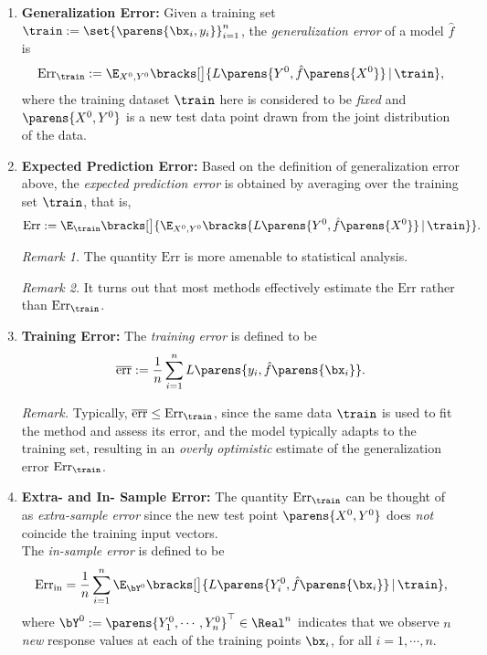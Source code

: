 \documentclass[12pt]{article}
\begin{document}
\begin{enumerate}[label=\textbf{\arabic*.}]
	
	\item \textbf{Generalization Error:} Given a training set $ \train := \set{ \parens{\bx_i, y_i}}_{i=1}^n$, the \emph{generalization error} of a model $\hat{f}$ is 
	\begin{align}
		\mathrm{Err}_{\train} := \E_{X^0, Y^0} \bracks[\big]{ L \parens{Y^0, \hat{f} \parens{X^0} } \,\vert\, \train }, 
	\end{align}
	where the training dataset $\train$ here is considered to be \emph{fixed} and $\parens{X^0, Y^0}$ is a new test data point drawn from the joint distribution of the data. 
	
	\item \textbf{Expected Prediction Error:} Based on the definition of generalization error above, the \emph{expected prediction error} is obtained by averaging over the training set $\train$, that is, 
	\begin{align}
		\mathrm{Err} := \E_{\train} \bracks[\big]{ \E_{X^0, Y^0} \bracks{ L \parens{Y^0, \hat{f} \parens{X^0} } \,\vert\, \train } }. 
	\end{align}
	
	\textit{Remark 1.} The quantity $\mathrm{Err}$ is more amenable to statistical analysis. 

	\textit{Remark 2.} It turns out that most methods effectively estimate the $\mathrm{Err}$ rather than $\mathrm{Err}_{\train}$. 
	
	\item \textbf{Training Error:} The \emph{training error} is defined to be 
	\begin{align}
		\overline{\mathrm{err}} := \frac{1}{n} \sum_{i=1}^n L \parens{y_i, \hat{f} \parens{\bx_i}}.  
	\end{align}
	
	\textit{Remark.} Typically, $\overline{\mathrm{err}} \le \text{Err}_{\train}$, since the same data $\train$ is used to fit the method and assess its error, and the model typically adapts to the training set, resulting in an \textit{overly optimistic} estimate of the generalization error $\mathrm{Err}_{\train}$. 
	
	\item \textbf{Extra- and In- Sample Error:} The quantity $\mathrm{Err}_{\train}$ can be thought of as \textit{extra-sample error} since the new test point $\parens{X^0, Y^0}$ does \emph{not} coincide the training input vectors. \\ The \textit{in-sample error} is defined to be 
	\begin{align}
		\mathrm{Err}_{\mathrm{in}} = \frac{1}{n} \sum_{i=1}^n \E_{\bY^0} \bracks[\big]{ L \parens{Y^0_i, \hat{f} \parens{\bx_i} } \,\vert\, \train }, 
	\end{align}
	where $\bY^0 := \parens{Y_1^0, \cdots, Y_n^0}^\top \in \Real^n$ indicates that we observe $n$ \emph{new} response values at each of the training points $\bx_i$, for all $i = 1, \cdots, n$. 
	

\end{enumerate}
\end{document}

